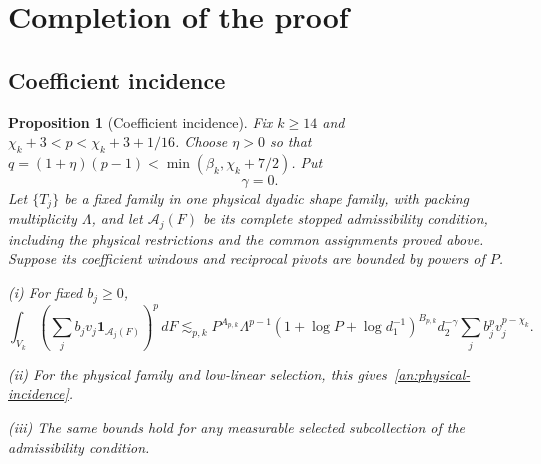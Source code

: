 \documentclass[11pt]{amsart}
\newtheorem{proposition}[theorem]{Proposition}
\theoremstyle{definition}
\theoremstyle{remark}
\numberwithin{equation}{section}
\begin{document}
\section{Completion of the proof}\label{an:assembly}\label{an:assembly-section}

\subsection{Coefficient incidence}\label{completion:incidence}\label{an:coefficient-assembly}

\begin{proposition}[Coefficient incidence]\label{an:unified-incidence}\label{an:higher-incidence}
Fix $k\ge14$ and $\chi_k+3<p<\chi_k+3+1/16$. Choose $\eta>0$ so that $q=(1+\eta)(p-1)<\min(\beta_k,\chi_k+7/2)$. Put
\[
\gamma=0.
\]
Let $\{T_j\}$ be a fixed family in one physical dyadic shape family, with packing multiplicity $\Lambda$, and let $\mathcal A_j(F)$ be its complete stopped admissibility condition, including the physical restrictions and the common assignments proved above. Suppose its coefficient windows and reciprocal pivots are bounded by powers of $P$.

\noindent\textup{(i)} For fixed $b_j\ge0$,
\begin{equation}\label{an:unified-window-incidence}
\int_{V_k}\left(\sum_jb_jv_j\mathbf1_{\mathcal A_j(F)}\right)^p\,dF\lesssim_{p,k} P^{A_{p,k}}\Lambda^{p-1}(1+\log P+\log d_1^{-1})^{B_{p,k}}d_2^{-\gamma}\sum_jb_j^pv_j^{p-\chi_k}.
\end{equation}

\noindent\textup{(ii)} For the physical family and low-linear selection, this gives~\eqref{an:physical-incidence}.

\noindent\textup{(iii)} The same bounds hold for any measurable selected subcollection of the admissibility condition.
\end{proposition}
\end{document}
